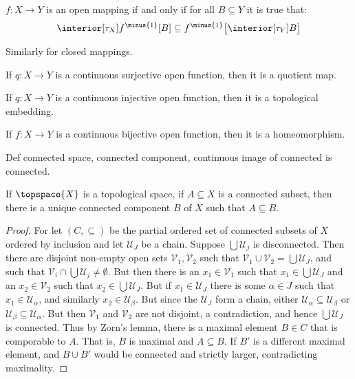     \begin{theorem}
        $f:X\rightarrow{Y}$ is an open mapping if and only if for all
        $B\subseteq{Y}$ it is true that:
        \begin{equation}
            \interior[\tau_{X}]{f^{\minus{1}}[B]}\subseteq
            f^{\minus{1}}\big[\interior[\tau_{Y}]{B}\big]
        \end{equation}
    \end{theorem}
    Similarly for closed mappings.
    \begin{theorem}
        If $q:X\rightarrow{Y}$ is a continuous surjective open function,
        then it is a quotient map.
    \end{theorem}
    \begin{theorem}
        If $q:X\rightarrow{Y}$ is a continuous injective open function,
        then it is a topological embedding.
    \end{theorem}
    \begin{theorem}
        If $f:X\rightarrow{Y}$ is a continuous bijective open function,
        then it is a homeomorphism.
    \end{theorem}
    Def connected space, connected component, continuous image of connected
    is connected.
    \begin{theorem}
        If $\topspace{X}$ is a topological space, if $A\subseteq{X}$ is a
        connected subset, then there is a unique connected component
        $B$ of $X$ such that $A\subseteq{B}$.
    \end{theorem}
    \begin{proof}
        For let $(C,\subseteq)$ be the partial ordered set of connected
        subsets of $X$ ordered by inclusion and let $\mathcal{U}_{J}$ be a
        chain. Suppose $\bigcup\mathcal{U}_{j}$ is disconnected. Then there
        are disjoint non-empty open sets $\mathcal{V}_{1},\mathcal{V}_{2}$
        such that
        $\mathcal{V}_{1}\cup\mathcal{V}_{2}=\bigcup\mathcal{U}_{J}$, and
        such that $\mathcal{V}_{i}\cap\bigcup\mathcal{U}_{j}\ne\emptyset$.
        But then there is an $x_{1}\in\mathcal{V}_{1}$ such that
        $x_{1}\in\bigcup\mathcal{U}_{J}$ and an $x_{2}\in\mathcal{V}_{2}$
        such that $x_{2}\in\bigcup\mathcal{U}_{J}$. But if
        $x_{1}\in\mathcal{U}_{J}$ there is some $\alpha\in{J}$ such that
        $x_{1}\in\mathcal{U}_{\alpha}$, and similarly
        $x_{2}\in\mathcal{U}_{\beta}$. But since the $\mathcal{U}_{J}$ form
        a chain, either $\mathcal{U}_{\alpha}\subseteq\mathcal{U}_{\beta}$
        or $\mathcal{U}_{\beta}\subseteq\mathcal{U}_{\alpha}$. But then
        $\mathcal{V}_{1}$ and $\mathcal{V}_{2}$ are not disjoint, a
        contradiction, and hence $\bigcup\mathcal{U}_{J}$ is connected.
        Thus by Zorn's lemma, there is a maximal element $B\in{C}$ that is
        comporable to $A$. That is, $B$ is maximal and $A\subseteq{B}$.
        If $B'$ is a different maximal element, and
        $B\cup{B}'$ would be connected and strictly larger, contradicting
        maximality.
    \end{proof}
